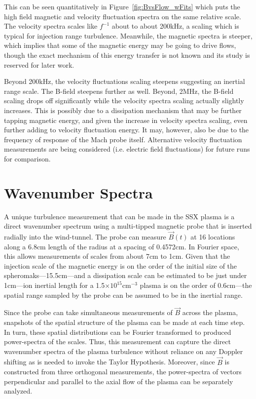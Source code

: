 \documentclass[aip,prl,amsmath,amssymb,reprint,superscriptaddress]{revtex4-1} %
\begin{document}
This can be seen quantitatively in Figure~\ref{fig:BvsFlow_wFits} which puts the high field magnetic and velocity fluctuation spectra on the same relative scale. The velocity spectra scales like $f^{-1}$ about to about 200kHz, a scaling which is typical for injection range turbulence. Meanwhile, the magnetic spectra is steeper, which implies that some of the magnetic energy may be going to drive flows, though the exact mechanism of this energy transfer is not known and its study is reserved for later work.

Beyond 200kHz, the velocity fluctuations scaling steepens suggesting an inertial range scale. The B-field steepens further as well. Beyond, 2MHz, the B-field scaling drops off significantly while the velocity spectra scaling actually slightly increases. This is possibly due to a dissipation mechanism that may be further tapping magnetic energy, and given the increase in velocity spectra scaling, even further adding to velocity fluctuation energy. It may, however, also be due to the frequency of response of the Mach probe itself. Alternative velocity fluctuation measurements are being considered (i.e. electric field fluctuations) for future runs for comparison.

\section{Wavenumber Spectra}

A unique turbulence measurement that can be made in the SSX plasma is a direct wavenumber spectrum using a multi-tipped magnetic probe that is inserted radially into the wind-tunnel. The probe can measure $\vec{B}(t)$ at 16 locations along a 6.8cm length of the radius at a spacing of 0.4572cm. In Fourier space, this allows measurements of scales from about 7cm to 1cm. Given that the injection scale of the magnetic energy is on the order of the initial size of the spheromaks---15.5cm---and a dissipation scale can be estimated to be just under 1cm---ion inertial length for a 1.5$\times 10^{15}$cm$^{-3}$ plasma is on the order of 0.6cm---the spatial range sampled by the probe can be assumed to be in the inertial range.

Since the probe can take simultaneous measurements of $\vec{B}$ across the plasma, snapshots of the spatial structure of the plasma can be made at each time step. In turn, these spatial distributions can be Fourier transformed to produced power-spectra of the scales. Thus, this measurement can capture the direct wavenumber spectra of the plasma turbulence without reliance on any Doppler shifting as is needed to invoke the Taylor Hypothesis. Moreover, since $\vec{B}$ is constructed from three orthogonal measurements, the power-spectra of vectors perpendicular and parallel to the axial flow of the plasma can be separately analyzed. 
\end{document}
